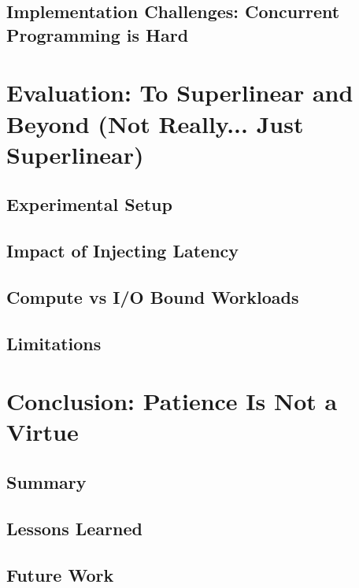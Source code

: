 \documentclass[bsc,frontabs,singlespacing,parskip,deptreport,normalheadings]{infthesis}
\begin{document}
\section{Implementation Challenges: Concurrent Programming is Hard}


\chapter{Evaluation: To Superlinear and Beyond (Not Really... Just Superlinear)}
\label{chapter:evaluation:_to_superlinear_and_beyond_(not_really..._just_superlinear)}

\section{Experimental Setup}

\section{Impact of Injecting Latency}

\section{Compute vs I/O Bound Workloads}

\section{Limitations}


\chapter{Conclusion: Patience Is Not a Virtue}

\section{Summary}

\section{Lessons Learned}

\section{Future Work}
\end{document}
